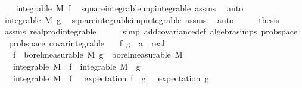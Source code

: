 \begin{isabellebody}
\ \ \isamarkupfalse%
\ {\isachardoublequoteopen}integrable\ M\ f{\isachardoublequoteclose}\ \isamarkupfalse%
\ square{\isacharunderscore}{\kern0pt}integrable{\isacharunderscore}{\kern0pt}imp{\isacharunderscore}{\kern0pt}integrable\ assms\ \isamarkupfalse%
\ auto\isanewline
\ \ \isamarkupfalse%
\ \isamarkupfalse%
\ {\isachardoublequoteopen}integrable\ M\ g{\isachardoublequoteclose}\ \isamarkupfalse%
\ square{\isacharunderscore}{\kern0pt}integrable{\isacharunderscore}{\kern0pt}imp{\isacharunderscore}{\kern0pt}integrable\ assms\ \isamarkupfalse%
\ auto\isanewline
\ \ \isamarkupfalse%
\ \isamarkupfalse%
\ {\isacharquery}{\kern0pt}thesis\isanewline
\ \ \ \ \isamarkupfalse%
\ assms\ real{\isacharunderscore}{\kern0pt}prod{\isacharunderscore}{\kern0pt}integrable\isanewline
\ \ \ \ \isamarkupfalse%
\ {\isacharparenleft}{\kern0pt}simp\ add{\isacharcolon}{\kern0pt}covariance{\isacharunderscore}{\kern0pt}def\ algebra{\isacharunderscore}{\kern0pt}simps\ prob{\isacharunderscore}{\kern0pt}space{\isacharparenright}{\kern0pt}\isanewline
{}\isamarkupfalse%
%
\endisatagproof
{\isafoldproof}%
%
\isadelimproof
\isanewline
%
\endisadelimproof
\isanewline
{}\isamarkupfalse%
\ {\isacharparenleft}{\kern0pt}\ prob{\isacharunderscore}{\kern0pt}space{\isacharparenright}{\kern0pt}\ covar{\isacharunderscore}{\kern0pt}integrable{\isacharcolon}{\kern0pt}\isanewline
\ \ \ f\ g\ {\isacharcolon}{\kern0pt}{\isacharcolon}{\kern0pt}\ {\isachardoublequoteopen}{\isacharprime}{\kern0pt}a\ {\isasymRightarrow}\ real{\isachardoublequoteclose}\isanewline
\ \ \ {\isachardoublequoteopen}f\ {\isasymin}\ borel{\isacharunderscore}{\kern0pt}measurable\ M{\isachardoublequoteclose}\ {\isachardoublequoteopen}g\ {\isasymin}\ borel{\isacharunderscore}{\kern0pt}measurable\ M{\isachardoublequoteclose}\isanewline
\ \ \ {\isachardoublequoteopen}integrable\ M\ {\isacharparenleft}{\kern0pt}{\isasymlambda}{\isasymomega}{\isachardot}{\kern0pt}\ f\ {\isasymomega}{\isacharcircum}{\kern0pt}{}{\isacharparenright}{\kern0pt}{\isachardoublequoteclose}\ {\isachardoublequoteopen}integrable\ M\ {\isacharparenleft}{\kern0pt}{\isasymlambda}{\isasymomega}{\isachardot}{\kern0pt}\ g\ {\isasymomega}{\isacharcircum}{\kern0pt}{}{\isacharparenright}{\kern0pt}{\isachardoublequoteclose}\isanewline
\ \ \ {\isachardoublequoteopen}integrable\ M\ {\isacharparenleft}{\kern0pt}{\isasymlambda}{\isasymomega}{\isachardot}{\kern0pt}\ {\isacharparenleft}{\kern0pt}f\ {\isasymomega}\ {\isacharminus}{\kern0pt}\ expectation\ f{\isacharparenright}{\kern0pt}\ {\isacharasterisk}{\kern0pt}\ {\isacharparenleft}{\kern0pt}g\ {\isasymomega}\ {\isacharminus}{\kern0pt}\ expectation\ g{\isacharparenright}{\kern0pt}{\isacharparenright}{\kern0pt}{\isachardoublequoteclose}\isanewline

\end{isabellebody}
